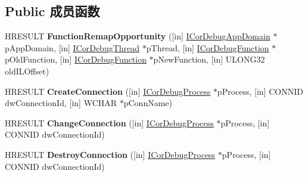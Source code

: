 \subsection*{Public 成员函数}
\begin{DoxyCompactItemize}
\item 
\mbox{\label{interface_i_cor_debug_managed_callback2_ae6b540656013fc91631676863bbedff2}} 
H\+R\+E\+S\+U\+LT {\bfseries Function\+Remap\+Opportunity} (\mbox{[}in\mbox{]} \hyperlink{interface_i_cor_debug_app_domain}{I\+Cor\+Debug\+App\+Domain} $\ast$p\+App\+Domain, \mbox{[}in\mbox{]} \hyperlink{interface_i_cor_debug_thread}{I\+Cor\+Debug\+Thread} $\ast$p\+Thread, \mbox{[}in\mbox{]} \hyperlink{interface_i_cor_debug_function}{I\+Cor\+Debug\+Function} $\ast$p\+Old\+Function, \mbox{[}in\mbox{]} \hyperlink{interface_i_cor_debug_function}{I\+Cor\+Debug\+Function} $\ast$p\+New\+Function, \mbox{[}in\mbox{]} U\+L\+O\+N\+G32 old\+I\+L\+Offset)
\item 
\mbox{\label{interface_i_cor_debug_managed_callback2_a7ee981cacaae529a6dc7d04c9043836c}} 
H\+R\+E\+S\+U\+LT {\bfseries Create\+Connection} (\mbox{[}in\mbox{]} \hyperlink{interface_i_cor_debug_process}{I\+Cor\+Debug\+Process} $\ast$p\+Process, \mbox{[}in\mbox{]} C\+O\+N\+N\+ID dw\+Connection\+Id, \mbox{[}in\mbox{]} W\+C\+H\+AR $\ast$p\+Conn\+Name)
\item 
\mbox{\label{interface_i_cor_debug_managed_callback2_aa46f77d8b433ad09ff84b6c83d4097eb}} 
H\+R\+E\+S\+U\+LT {\bfseries Change\+Connection} (\mbox{[}in\mbox{]} \hyperlink{interface_i_cor_debug_process}{I\+Cor\+Debug\+Process} $\ast$p\+Process, \mbox{[}in\mbox{]} C\+O\+N\+N\+ID dw\+Connection\+Id)
\item 
\mbox{\label{interface_i_cor_debug_managed_callback2_ad44288eec33cd5138c12b996913d51ba}} 
H\+R\+E\+S\+U\+LT {\bfseries Destroy\+Connection} (\mbox{[}in\mbox{]} \hyperlink{interface_i_cor_debug_process}{I\+Cor\+Debug\+Process} $\ast$p\+Process, \mbox{[}in\mbox{]} C\+O\+N\+N\+ID dw\+Connection\+Id)
\item 
\mbox{\label{interface_i_cor_debug_managed_callback2_aa75712a6a0e0f6e84f3f73c145098363}} 

\end{DoxyCompactItemize}
